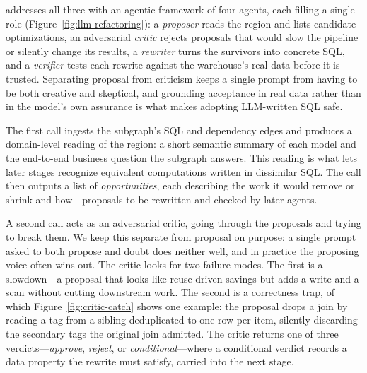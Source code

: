 



\tool{} addresses all three with an agentic framework of four agents, each filling a single role  (Figure~\ref{fig:llm-refactoring}): a \emph{proposer} reads the region and lists candidate optimizations, an adversarial \emph{critic} rejects proposals that would slow the pipeline or silently change its results, a \emph{rewriter} turns the survivors into concrete SQL, and a \emph{verifier} tests each rewrite against the warehouse's real data before it is trusted. Separating proposal from criticism keeps a single prompt from having to be both creative and skeptical, and grounding acceptance in real data rather than in the model's own assurance is what makes adopting LLM-written SQL safe.



The first call ingests the subgraph's SQL and dependency edges and produces a domain-level reading of the region: a short semantic summary of each model and the end-to-end business question the subgraph answers. This reading is what lets later stages recognize equivalent computations written in dissimilar SQL. 
The call then outputs a list of \emph{opportunities}, each describing the work it would remove or shrink and how—proposals to be rewritten and checked by later agents.

 A second call acts as an adversarial critic, going through the proposals and trying to break them. We keep this separate from proposal on purpose: a single prompt asked to both propose and doubt does neither well, and in practice the proposing voice often wins out. The critic looks for two failure modes. The first is a slowdown—a proposal that looks like reuse-driven savings but adds a write and a scan without cutting downstream work. The second is a correctness trap, of which Figure~\ref{fig:critic-catch} shows one example: the proposal drops a join by reading a tag from a sibling deduplicated to one row per item, silently discarding the secondary tags the original join admitted. The critic returns one of three verdicts—\emph{approve}, \emph{reject}, or \emph{conditional}—where a conditional verdict records a data property the rewrite must satisfy, carried into the next stage.

